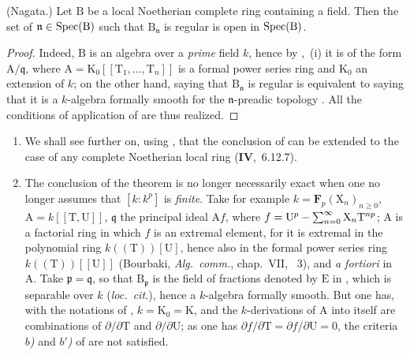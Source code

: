 \begin{corollary}[22.7.6]
\label{0.22.7.6}
\textnormal{(Nagata.)}
Let $\mathrm{B}$ be a local Noetherian complete ring containing a field.
Then the set of $\mathfrak{n}\in\operatorname{Spec}(\mathrm{B})$ such that $\mathrm{B}_\mathfrak{n}$ is regular is open in $\operatorname{Spec}(\mathrm{B})$.
\end{corollary}

\begin{proof}
Indeed, $\mathrm{B}$ is an algebra over a \emph{prime} field $k$, hence by ,~(i) it is of the form $\mathrm{A}/\mathfrak{q}$, where $\mathrm{A}=\mathrm{K}_0[[\mathrm{T}_1,\ldots,\mathrm{T}_n]]$ is a formal power series ring and $\mathrm{K}_0$ an extension of $k$; on the other hand, saying that $\mathrm{B}_\mathfrak{n}$ is regular is equivalent to saying that it is a $k$-algebra formally smooth for the $\mathfrak{n}$-preadic topology .
All the conditions of application of  are thus realized.
\end{proof}

\begin{remark}[22.7.7]
\label{0.22.7.7}
\begin{enumerate}
  \item[\rm{(i)}] We shall see further on, using , that the conclusion of  can be extended to the case of any complete Noetherian local ring (\textbf{IV},~6.12.7).
  \item[\rm{(ii)}] The conclusion of the theorem  is no longer necessarily exact when one no longer assumes that $[k:k^p]$ is \emph{finite}.
  Take for example $k=\mathbf{F}_p(\mathrm{X}_n)_{n\geq 0}$, $\mathrm{A}=k[[\mathrm{T},\mathrm{U}]]$, $\mathfrak{q}$ the principal ideal $\mathrm{A}f$, where $f=\mathrm{U}^p-\sum_{n=0}^\infty\mathrm{X}_n\mathrm{T}^{np}$; $\mathrm{A}$ is a factorial ring in which $f$ is an extremal element, for it is extremal in the polynomial ring $k((\mathrm{T}))[\mathrm{U}]$, hence also in the formal power series ring $k((\mathrm{T}))[[\mathrm{U}]]$ (Bourbaki, \emph{Alg.~comm.}, chap.~VII, \textsection~3), and \emph{a fortiori} in $\mathrm{A}$.
  Take $\mathfrak{p}=\mathfrak{q}$, so that $\mathrm{B}_\mathfrak{p}$ is the field of fractions denoted by $\mathrm{E}$ in , which is separable over $k$ (\emph{loc.~cit.}), hence a $k$-algebra formally smooth.
  But one has, with the notations of , $k=\mathrm{K}_0=\mathrm{K}$, and the $k$-derivations of $\mathrm{A}$ into itself are combinations of $\partial/\partial\mathrm{T}$ and $\partial/\partial\mathrm{U}$; as one has $\partial f/\partial\mathrm{T}=\partial f/\partial\mathrm{U}=0$, the criteria \emph{$b$)} and \emph{$b'$)} of  are not satisfied.
\end{enumerate}
\end{remark}
